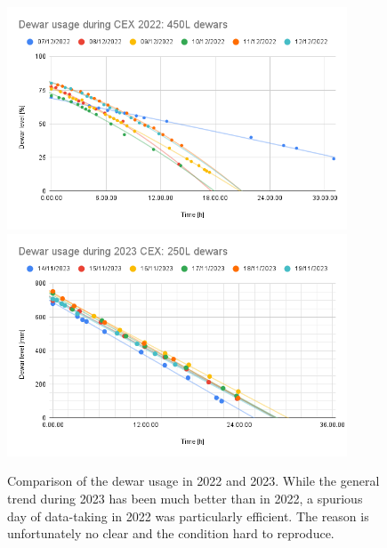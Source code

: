 \begin{refsection}
        \begin{figure}
            \centering
            \includegraphics[width=0.9\textwidth, keepaspectratio]{Figures/LH2/2022/CEX2022_dewars.png}
            \includegraphics[width=0.9\textwidth, keepaspectratio]{Figures/LH2/2023/2023CEX_dewars.png}
            \caption[Dewar usage in 2022 and 2023.]{Comparison of the dewar usage in 2022 and 2023. While the general trend during 2023 has been much better than in 2022, a spurious day of data-taking in 2022 was particularly efficient. The reason is unfortunately no clear and the condition hard to reproduce.}
            \label{fig:CEX:dewar}
        \end{figure}


\end{refsection}
